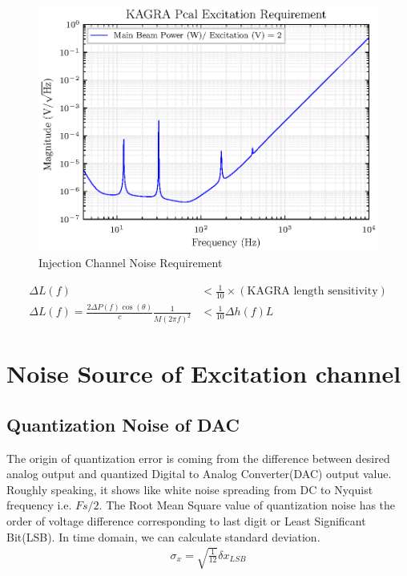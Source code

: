 \documentclass[12pt]{caltech_thesis}
\begin{document}
\begin{figure}[hbt!]
\centering
\includegraphics[width=.9\textwidth]{figure/DAC_requirement.eps}
\caption{Injection Channel Noise Requirement}\label{fig:DAC_noise_requirement}
\end{figure}

\begin{align}
   \Delta L(f) &< \frac{1}{10} \times (\text{KAGRA length sensitivity})\\
   \Delta L(f) =\frac{2 \Delta P(f) \cos(\theta)}{c} \frac{1}{M(2 \pi f)^2} &< \frac{1}{10} \Delta h(f) L
\end{align}








\section{Noise Source of Excitation channel}
\subsection{Quantization Noise of DAC}


The origin of quantization error is coming from the difference between desired analog output and quantized Digital to Analog Converter(DAC) output value. Roughly speaking, it shows like white noise spreading from DC to Nyquist frequency i.e. $Fs/2$.
The Root Mean Square value of quantization noise has the order of voltage difference corresponding to last digit or Least Significant Bit(LSB). In time domain, we can calculate standard deviation.
\begin{align}
   \sigma_x = \sqrt{\frac{1}{12}} \delta x_{LSB}
\end{align}
\end{document}
